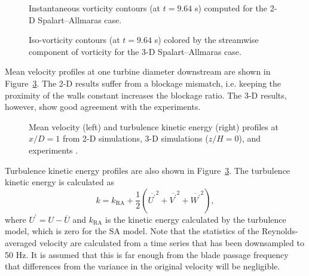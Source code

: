 \begin{figure}

    \caption{Instantaneous vorticity contours (at $t=9.64$ s) computed for the
        2-D Spalart--Allmaras case.}

    \label{fig:vorticity-2D}
\end{figure}

\begin{figure}
    \centering


    \caption{Iso-vorticity contours (at $t=9.64$ s) colored by the streamwise
        component of vorticity for the 3-D Spalart--Allmaras case.}

    \label{fig:vorticity-3D}
\end{figure}


Mean velocity profiles at one turbine diameter downstream are shown in
Figure~\ref{fig:profiles}. The 2-D results suffer from a blockage mismatch, i.e.
keeping the proximity of the walls constant increases the blockage ratio. The
3-D results, however, show good agreement with the experiments.

\begin{figure}
    \centering


    \caption{Mean velocity (left) and turbulence kinetic energy (right) profiles
        at $x/D=1$ from 2-D simulations, 3-D simulations ($z/H=0$), and experiments
        \cite{Bachant2015-JoT}.}

    \label{fig:profiles}
\end{figure}

Turbulence kinetic energy profiles are also shown in Figure~\ref{fig:profiles}.
The turbulence kinetic energy is calculated as
\begin{equation}
k = k_{\mathrm{RA}} + \frac{1}{2} \left(
\overline{U^\prime}^2 +
\overline{V^\prime}^2 +
\overline{W^\prime}^2 \right),
\label{eq:k}
\end{equation}
where $U^\prime = U - \overline{U}$ and $k_{\mathrm{RA}}$ is the kinetic energy
calculated by the turbulence model, which is zero for the SA model. Note that
the statistics of the Reynolds-averaged velocity are calculated from a time
series that has been downsampled to 50 Hz. It is assumed that this is far enough
from the blade passage frequency that differences from the variance in the
original velocity will be negligible.

